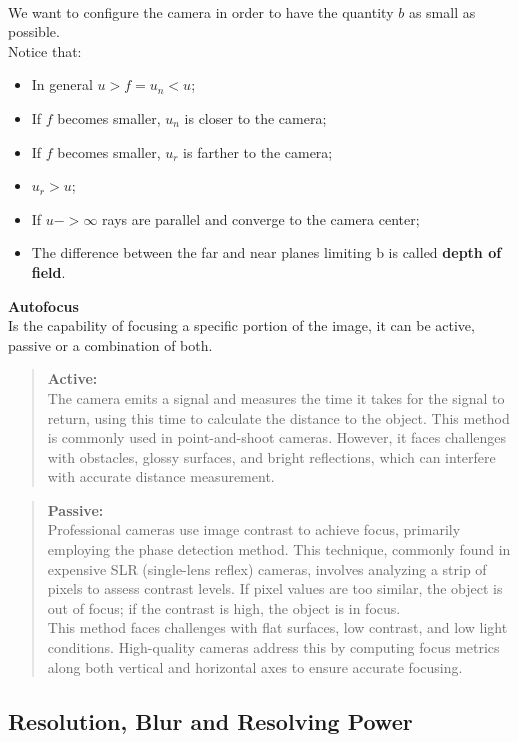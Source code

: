 \\We want to configure the camera in order to have the quantity $b$ as small as possible.
\\Notice that:
\begin{itemize}
    \item In general $u > f = u_n < u$;
    \item If $f$ becomes smaller, $u_n$ is closer to the camera;
    \item If $f$ becomes smaller, $u_r$ is farther to the camera;
    \item $u_r > u$;
    \item If $u -> \infty$ rays are parallel and converge to the camera center;
    \item The difference between the far and near planes limiting b is called \textbf{depth of field}. 
\end{itemize}

\textbf{Autofocus}
\\Is the capability of focusing a specific portion of the image, it can be active, passive or a combination of both.
\begin{quote}
    \textbf{Active:}  
    \\The camera emits a signal and measures the time it takes for the signal to return, using this time to calculate the distance to the object. 
    This method is commonly used in point-and-shoot cameras. 
    However, it faces challenges with obstacles, glossy surfaces, and bright reflections, which can interfere with accurate distance measurement.
\end{quote}
\begin{quote}
    \textbf{Passive:}
    \\Professional cameras use image contrast to achieve focus, primarily employing the phase detection method. 
    This technique, commonly found in expensive SLR (single-lens reflex) cameras, involves analyzing a strip of pixels to assess contrast levels. 
    If pixel values are too similar, the object is out of focus; if the contrast is high, the object is in focus.
    \\
    This method faces challenges with flat surfaces, low contrast, and low light conditions. 
    High-quality cameras address this by computing focus metrics along both vertical and horizontal axes to ensure accurate focusing.
\end{quote}

\subsection{Resolution, Blur and Resolving Power}

